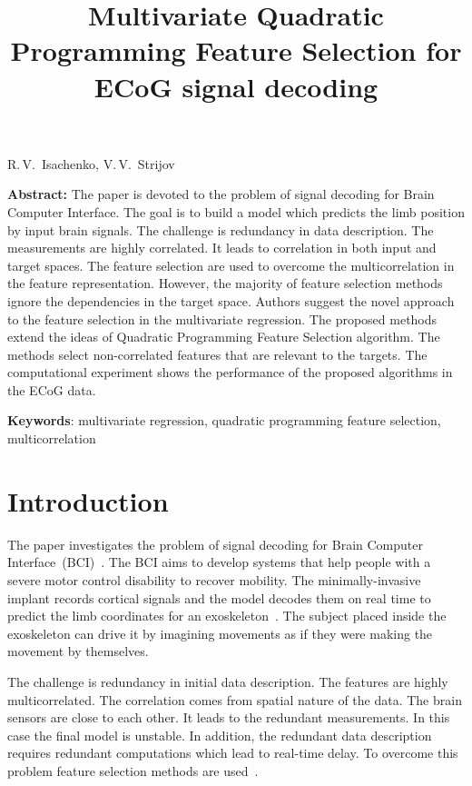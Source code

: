 \documentclass[12pt,twoside]{article}
\theoremstyle{definition}
\begin{document}
	
	\linenumbers
	
	\title
{Multivariate Quadratic Programming Feature Selection for ECoG signal decoding}
\date{}
\maketitle
\begin{center}
	R.\,V.~Isachenko,
	V.\,V.~Strijov
\end{center}
\textbf{Abstract:} 
The paper is devoted to the problem of signal decoding for Brain Computer Interface. 
The goal is to build a model which predicts the limb position by input brain signals. 
The challenge is redundancy in data description. 
The measurements are highly correlated. 
It leads to correlation in both input and target spaces.
The feature selection are used to overcome the multicorrelation in the feature representation.
However, the majority of feature selection methods ignore the dependencies in the target space.
Authors suggest the novel approach to the feature selection in the multivariate regression.
The proposed methods extend the ideas of Quadratic Programming Feature Selection algorithm. 
The methods select non-correlated features that are relevant to the targets. 
The computational experiment shows the performance of the proposed algorithms in the ECoG data.

\bigskip
\textbf{Keywords}: multivariate regression, quadratic programming feature selection, multicorrelation

\section{Introduction}
The paper investigates the problem of signal decoding for Brain Computer Interface~(BCI)~\cite{costecalde2018long}. 
The BCI aims to develop systems that help people with a severe motor control disability to recover mobility.
The minimally-invasive implant records cortical signals and the model decodes them on real time to predict the limb coordinates for an exoskeleton~\cite{mestais2015wimagine,eliseyev2014clinatec}.
The subject placed inside the exoskeleton can drive it by imagining movements as if they were making the movement by themselves. 

The challenge is redundancy in initial data description. 
The features are highly multicorrelated. 
The correlation comes from spatial nature of the data. 
The brain sensors are close to each other. 
It leads to the redundant measurements. 
In this case the final model is unstable. 
In addition, the redundant data description requires redundant computations which lead to real-time delay. 
To overcome this problem feature selection methods are used~\cite{katrutsa2015stress,li2017feature}.
\end{document}
